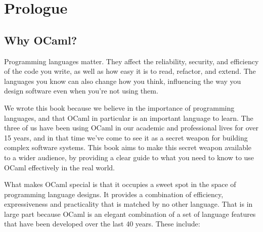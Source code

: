 \hypertarget{prologue}{%
\section{Prologue}\label{prologue}}

\hypertarget{why-ocaml}{%
\subsection{Why OCaml?}\label{why-ocaml}}

Programming languages matter. They affect the reliability, security, and
efficiency of the code you write, as well as how easy it is to read,
refactor, and extend. The languages you know can also change how you
think, influencing the way you design software even when you're not
using them.

We wrote this book because we believe in the importance of programming
languages, and that OCaml in particular is an important language to
learn. The three of us have been using OCaml in our academic and
professional lives for over 15 years, and in that time we've come to see
it as a secret weapon for building complex software systems. This book
aims to make this secret weapon available to a wider audience, by
providing a clear guide to what you need to know to use OCaml
effectively in the real world.

What makes OCaml special is that it occupies a sweet spot in the space
of programming language designs. It provides a combination of
efficiency, expressiveness and practicality that is matched by no other
language. That is in large part because OCaml is an elegant combination
of a set of language features that have been developed over the last 40
years. These include: 


